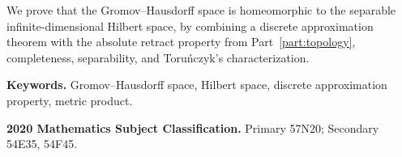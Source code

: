 We prove that the Gromov--Hausdorff space  is homeomorphic to the separable infinite-dimensional Hilbert space, by combining a discrete approximation theorem with the absolute retract property from Part~\ref{part:topology}, completeness, separability, and Toru\'nczyk's characterization.

\par\smallskip
\noindent\textbf{Keywords.} Gromov--Hausdorff space, Hilbert space, discrete approximation property, metric product.

\par\smallskip
\noindent\textbf{2020 Mathematics Subject Classification.} Primary 57N20; Secondary 54E35, 54F45.
